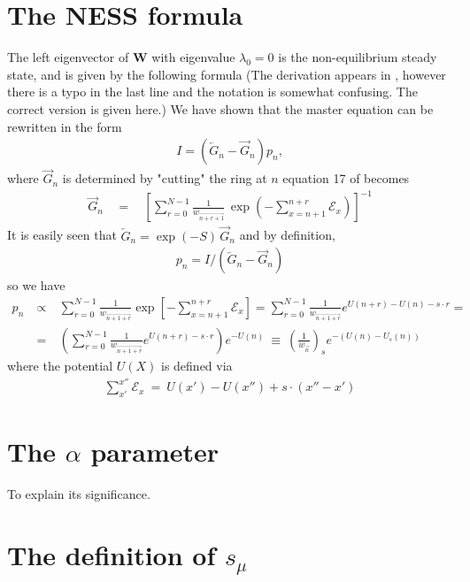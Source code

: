 \documentclass[aps,pre,floats,floatfix,twocolumn]{revtex4}
\newcommand{\beq}{\begin{eqnarray}}
\newcommand{\eeq}{\end{eqnarray}}
\begin{document}
\section{The NESS formula}
\label{Ap12}
%
The left eigenvector of ${\bm W}$ with eigenvalue $\lambda_0=0$ is 
the non-equilibrium steady state, and is given by the following formula (The derivation appears in \cite{nef}, however there is a typo in the last line and the notation is somewhat confusing. The correct version is given here.)
We have shown that the master equation can be rewritten in the form 
%
\beq
I = \left( \overleftarrow{G}_n {-} \overrightarrow{G}_n  \right)p_{n},  
\eeq
%
where $\overrightarrow{G}_n$ is determined by "cutting" the ring at $n$
equation 17 of \cite{nef} becomes 
%
\beq
\overrightarrow{G}_n \  \ &=& \ \ \left[ \sum_{r=0}^{N-1} \frac{1}{w_{\overrightarrow{n+r+1}}} 
\,\exp\left(-\sum_{x=n+1}^{n{+}r} \mathcal{E}_x \right) \right]^{-1} 
\eeq
%
It is easily seen that ${\overleftarrow{G}_n = \exp(-S) \, \overrightarrow{G}_n}$
and by definition, 
%
\beq
p_n = I/( \overleftarrow{G}_n - \overrightarrow{G}_n)
\eeq
%
so we have
%
\beq
p_n &\  \propto \ & 
\sum_{r=0}^{N-1} \frac{1}{w_{\overrightarrow{n+1+r}}} \exp \left[  - \sum_{x=n+1}^{n+r}  \mathcal{E}_x\right] = \sum_{r=0}^{N-1} \frac{1}{w_{\overrightarrow{n+1+r}}} e^{  U(n+r)-U(n)-s\cdot r} = \\
& \ = \ & \left (\sum_{r=0}^{N-1} \frac{1}{w_{\overrightarrow{n+1+r}}} e^{  U(n+r)-s\cdot r} \right)
e^{-U(n)} \ \equiv \ \left( \frac{1}{w_{\overrightarrow{n}}}\right)_s e^{-\left(U(n)-U_s(n)\right)}
\eeq
%
where the potential $U(X)$ is defined via
%
\beq
\sum_{x'}^{x''} \mathcal{E}_x \ = \ U(x'){-}U(x'') + s\cdot(x''{-}x')
\eeq  




\section{The $\alpha$ parameter}
\label{A0}

To explain its significance.



\section{The definition of $s_{\mu}$}
\label{A2}
\end{document}
